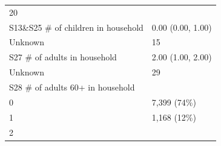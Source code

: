\documentclass[]{article}
\begin{document}
\begin{longtable}[]{@{}ll@{}}
\begin{minipage}[t]{0.23\columnwidth}
20\strut
\end{minipage}\tabularnewline
\begin{minipage}[t]{0.71\columnwidth}\raggedright
S13\&S25 \# of children in household\strut
\end{minipage} & \begin{minipage}[t]{0.23\columnwidth}\raggedright
0.00 (0.00, 1.00)\strut
\end{minipage}\tabularnewline
\begin{minipage}[t]{0.71\columnwidth}\raggedright
Unknown\strut
\end{minipage} & \begin{minipage}[t]{0.23\columnwidth}\raggedright
15\strut
\end{minipage}\tabularnewline
\begin{minipage}[t]{0.71\columnwidth}\raggedright
S27 \# of adults in household\strut
\end{minipage} & \begin{minipage}[t]{0.23\columnwidth}\raggedright
2.00 (1.00, 2.00)\strut
\end{minipage}\tabularnewline
\begin{minipage}[t]{0.71\columnwidth}\raggedright
Unknown\strut
\end{minipage} & \begin{minipage}[t]{0.23\columnwidth}\raggedright
29\strut
\end{minipage}\tabularnewline
\begin{minipage}[t]{0.71\columnwidth}\raggedright
S28 \# of adults 60+ in household\strut
\end{minipage} & \begin{minipage}[t]{0.23\columnwidth}\raggedright
\strut
\end{minipage}\tabularnewline
\begin{minipage}[t]{0.71\columnwidth}\raggedright
0\strut
\end{minipage} & \begin{minipage}[t]{0.23\columnwidth}\raggedright
7,399 (74\%)\strut
\end{minipage}\tabularnewline
\begin{minipage}[t]{0.71\columnwidth}\raggedright
1\strut
\end{minipage} & \begin{minipage}[t]{0.23\columnwidth}\raggedright
1,168 (12\%)\strut
\end{minipage}\tabularnewline
\begin{minipage}[t]{0.71\columnwidth}\raggedright
2\strut

\end{minipage}
\end{longtable}
\end{document}
